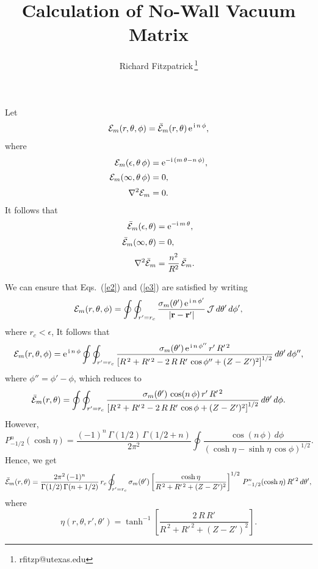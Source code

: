 \documentclass[12pt,prb,aps,notitlepage]{revtex4-1}
\begin{document}
\title{Calculation of No-Wall Vacuum Matrix}
\author{Richard Fitzpatrick\,\footnote{rfitzp@utexas.edu}}
\maketitle

Let 
\begin{equation}
{\cal E}_m(r,\theta,\phi)= \bar{\cal E}_m(r,\theta)\,{\rm e}^{\,{\rm i}\,n\,\phi},
\end{equation}
where
\begin{align}
{\cal E}_m(\epsilon,\theta\,\phi)&= {\rm e}^{-{\rm i}\,(m\,\theta-n\,\phi)},\\[0.5ex]
{\cal E}_m(\infty,\theta\,\phi)&= 0,\label{e2}\\[0.5ex]
\nabla^2{\cal E}_m &=0.\label{e3}
\end{align}
It follows that 
\begin{align}
\bar{\cal E}_m(\epsilon,\theta)&= {\rm e}^{-{\rm i}\,m\,\theta},\label{e5}\\[0.5ex]
\bar{\cal E}_m(\infty,\theta)&= 0,\\[0.5ex]
\nabla^2\bar{\cal E}_m &=\frac{n^2}{R^2}\,\bar{\cal E}_m.
\end{align}

We can ensure that Eqs.~(\ref{e2}) and (\ref{e3}) are satisfied by writing
\begin{equation}
{\cal E}_m(r,\theta,\phi) = \oint\oint_{r'=r_c}\frac{\sigma_m(\theta')\,{\rm e}^{\,{\rm i}\,n\,\phi'}}{|{\bf r}-{\bf r}'|}\,{\cal J}\,d\theta'\,d\phi',
\end{equation}
where $r_c<\epsilon$, 
It follows that
\begin{equation}
{\cal E}_m(r,\theta,\phi) 
={\rm e}^{\,{\rm i}\,n\,\phi}\oint\oint_{r'=r_c} 
\frac{\sigma_m(\theta')\,{\rm e}^{\,{\rm i}\,n\,\phi''}\,r'\,R'^{\,2}}
{\left[R^{\,2}+R'^{\,2} - 2\,R\,R'\,\cos\phi'' + (Z-Z')^2\right]^{1/2}}
\,d\theta'\,d\phi'',
\end{equation}
where $\phi''=\phi'-\phi$, which reduces to 
\begin{equation}
\bar{\cal E}_m(r,\theta) 
=\oint\oint_{r'=r_c} 
\frac{\sigma_m(\theta')\,\cos(n\,\phi)\,r'\,R'^{\,2}}
{\left[R^{\,2}+R'^{\,2} - 2\,R\,R'\,\cos\phi + (Z-Z')^2\right]^{1/2}}
\,d\theta'\,d\phi.
\end{equation}
However, 
\begin{equation}
P_{-1/2}^n(\cosh\eta) = \frac{(-1)^n\,\Gamma(1/2)\,\Gamma(1/2+n)}{2\pi^2}\oint
\frac{\cos(n\,\phi)\,d\phi}{(\cosh\eta-\sinh\eta\,\cos\phi)^{1/2}}.
\end{equation}
Hence, we get
\begin{equation}
\bar{\cal E}_m(r,\theta) = \frac{2\pi^2\,(-1)^n}{\Gamma(1/2)\,\Gamma(n+1/2)}\,r_c\oint_{r'=r_c}\sigma_m(\theta')\left[\frac{\cosh\eta}
{R^{\,2} + R'^{\,2}+(Z-Z')^2}\right]^{1/2}\,P_{-1/2}^n(\cosh\eta)\,R'^{\,2}\,d\theta',
\end{equation}
where
\begin{equation}
\eta(r,\theta,r',\theta')= \tanh^{-1}\left[\frac{2\,R\,R'}{R^{\,2} + R'^{\,2} + (Z-Z')^2}\right].
\end{equation}
\end{document}

